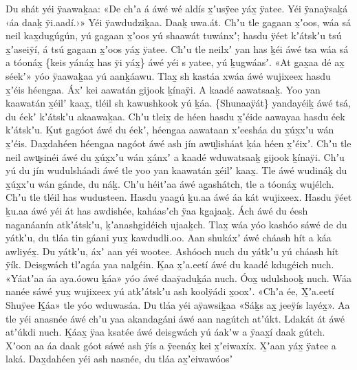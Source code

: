\begin{pairs}
\begin{Leftside}
Du shát yéi ÿaawaḵaa:
«\!De chʼa á áwé wé aldís x̱ʼusÿee yáx̱ ÿatee.
Yéi ÿanaÿsaḵá ‹\!áa daaḵ ÿi.aadí.\!›\!»
Yéi ÿawdudziḵaa.
Daaḵ uwa.át.
\pend
\pstart
{}Chʼu tle g̱agaan x̱ʼoos, wáa sá neil kax̱du\-gúg̱ún, yú g̱agaan x̱ʼoos yú shaawát tuwánxʼ;
hasdu ÿéet kʼátskʼu tsú x̱ʼaseiÿí, á tsú g̱agaan x̱ʼoos yáx̱ ÿatee.
Chʼu tle neilxʼ yan has ḵéi áwé tsa wáa sá a tóonáx̱ \{keis yánáx̱ has ÿi yáx̱\} áwé yéi s yatee, yú ḵugwáasʼ.
«\!At g̱ax̱aa dé ax̱ séekʼ\!» yóo ÿaawaḵaa yú aanḵáawu.
Tlax̱ sh kastáa xwáa áwé wujixeex hasdu x̱ʼéis héeng̱aa.
Áxʼ kei aawatán gijook ḵínaÿi.
A kaadé aawatsaaḵ.
Yoo yan kaawatán x̱éilʼ kaax̱, tléil sh kawushkook yú ḵáa.
\{Shunaaÿát\} yandayéiḵ áwé tsá, du éekʼ kʼátskʼu akaawaḵaa.
Chʼu tleix̱ de héen hasdu x̱ʼéi\-de aawayaa hasdu éek kʼátskʼu.
Ḵut g̱agóot áwé du éekʼ, héeng̱aa aawataan xʼeesháa du x̱úx̱\-xʼu wán x̱ʼéis.
Dax̱dahéen héeng̱aa nagóot áwé ash jín awu̬lisháat ḵáa héen x̱ʼéixʼ.
Chʼu tle neil awu̬sinéi áwé du x̱úx̱xʼu wán x̱ánxʼ a kaadé wduwatsaaḵ gijook ḵínaÿi.
Chʼu yú du jín wudulsháadi áwé tle yoo yan kaawatán x̱éilʼ kaax̱.
Tle áwé wudináḵ du x̱úx̱xʼu wán gánde, du náḵ.
Chʼu héitʼaa áwé ag̱ashátch, tle a tóonáx̱ wujélch.
Chʼu tle tléil has wudusteen.
Hasdu yaagú ḵu.aa áwé áa kát wujixeex.
\pend
\pstart
{}Hasdu ÿéet ḵu.aa áwé yéi át has awdi\-shée, kaháasʼch ÿaa kg̱ajaaḵ.
Ách áwé du éesh nag̱a\-náanín atkʼátskʼu, ḵʼanashgidéich ujaaḵch.
Tlax̱ wáa yóo kashóo sáwé de du yátkʼu, du tláa tin gáani yux̱ kawdudli.oo.
Aan shukáxʼ áwé cháash hít a káa awliyéx̱.
Du yátkʼu, áxʼ aan yéi wootee.
Ashóoch nuch du yátkʼu yú cháash hít ÿík.
Deisgwách tlʼag̱áa yaa nalgéin.
Ḵaa x̱ʼa.eetí áwé du kaadé kdug̱éich nuch.
«\!Yáatʼaa áa aya.óowu ḵáa\!» yóo áwé daaÿaduḵáa nuch.
Óox̱ udulshooḵ nuch.
Wáa nanée sáwé yux̱ wujixeex yú atkʼátskʼu ash koolÿádi x̱ooxʼ.
«\!Chʼa ée, X̱ʼa.eetí Shuÿee Ḵáa\!» tle yóo wdu\-wasáa.
Du tláa yéi aÿawsiḵaa «\!Sáḵs ax̱ jee\-ÿís layéx̱\!».
Aa tle yéi anasnée áwé chʼu yaa akandagáni áwé aan nagútch atʼúkt.
Lda\-kát át áwé atʼúkdi nuch.
Ḵáax̱ ÿaa ksatée áwé deisgwách yú áakʼw a ÿaax̱í daak gútch.
\pend
\pstart
{}Xʼoon aa áa daak góot sáwé ash ÿís a ÿeenáx̱ kei x̱ʼeiwaxíx.
X̱ʼaan yáx̱ ÿatee a laká.
Dax̱dahéen yéi ash nasnée, du tláa ax̱ʼeiwawóosʼ

\end{Leftside}
\end{pairs}
